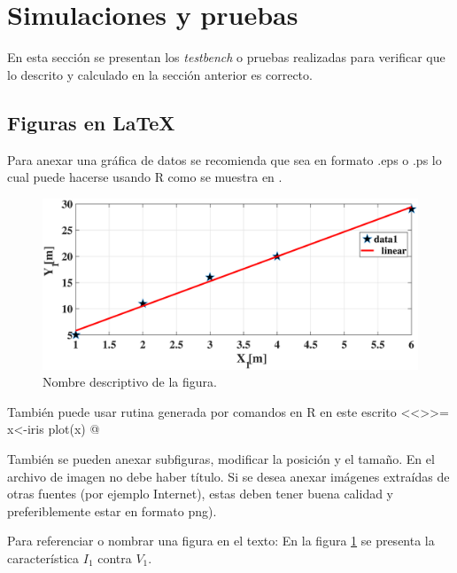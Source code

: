 \documentclass[journal]{IEEEtran}
\begin{document}
\section{Simulaciones y pruebas}
En esta sección se presentan los \emph{testbench} o pruebas realizadas para verificar que lo descrito y calculado en la sección anterior es correcto.

\subsection{Figuras en \LaTeX}
Para anexar una gráfica de datos se recomienda que sea en formato .eps o .ps lo cual puede hacerse usando R como se muestra en \cite{imagenes}.  
\begin{figure}[H] %
\centering  %
\includegraphics[scale=0.23]{fig} %
\caption{Nombre descriptivo de la figura.} %
\label{lvdt4} %
\end{figure}
También puede usar rutina  generada por comandos en R en este escrito
<<>>=
x<-iris
plot(x)
@

También se pueden anexar subfiguras, modificar la posición y el tamaño. En el archivo de imagen no debe haber título. Si se desea anexar imágenes extraídas de otras fuentes (por ejemplo Internet), estas deben tener buena calidad y preferiblemente estar en formato png).

Para referenciar o nombrar una figura en el texto: En la figura \ref{lvdt4} se presenta la característica $I_1$ contra $V_1$.
\end{document}
